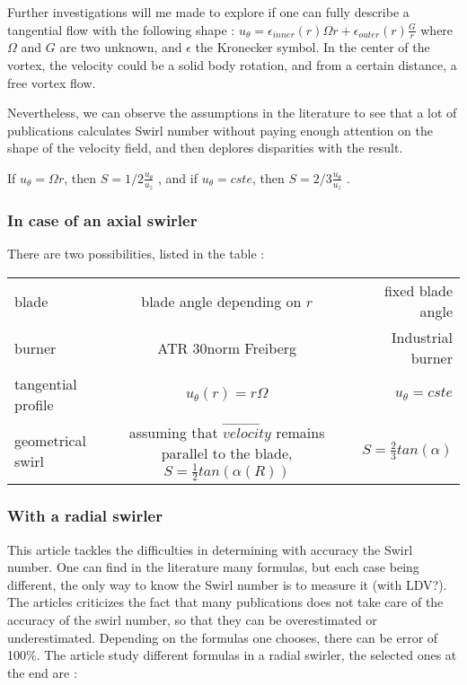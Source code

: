 Further investigations will me made to explore if one can fully describe a tangential flow with the following shape : $u_{\theta}=\epsilon_{inner}(r) \Omega r + \epsilon_{outer}(r) \frac{G}{r}$ where $\Omega$ and $G$ are two unknown, and $\epsilon$ the Kronecker symbol. In the center of the vortex, the velocity could be a solid body rotation, and from a certain distance, a free vortex flow.

Nevertheless, we can observe the assumptions in the literature to see that a lot of publications calculates Swirl number without paying enough attention on the shape of the velocity field, and then deplores disparities with the result.

If $u_{\theta}=\Omega r$, then $S=1/2 \frac{u_{\theta}}{u_{z}}$ , and if $u_{\theta}=cste$, then $S=2/3 \frac{u_{\theta}}{u_{z}}$ .

\subsubsection{In case of an axial swirler}
There are two possibilities, listed in the table  :

\begin{tabular}{ l | c | r }
  \hline			
 blade & blade angle depending on $r$ & fixed blade angle \\
  burner & ATR 30norm Freiberg  & Industrial burner \\
  tangential profile & $u_{\theta}(r)=r\Omega$ & $u_{\theta}=cste$ \\
geometrical swirl &  assuming that $\vec{velocity}$ remains parallel to the blade, $S=\frac{1}{2}tan(\alpha(R))$& $S=\frac{2}{3}tan(\alpha)$ \\
  \hline  
\end{tabular}

\subsubsection{With a radial swirler}

\cite{durox_flame_2013} This article tackles the difficulties in determining with accuracy the Swirl number. One can find in the literature many formulas, but each case being different, the only way to know the Swirl number is to measure it (with LDV?). The articles criticizes the fact that many publications does not take care of the accuracy of the swirl number, so that they can be overestimated or underestimated. Depending on the formulas one chooses, there can be error of 100\%. The article study different formulas in a radial swirler, the selected ones at the end are :

